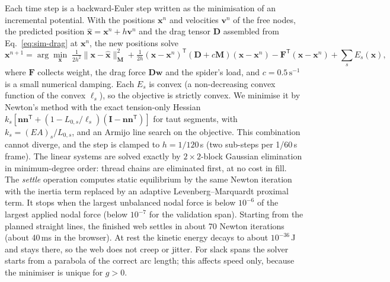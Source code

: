 Each time step is a backward-Euler step written as the minimisation of an incremental potential. With the positions
$\mathbf x^n$ and velocities $\mathbf v^n$ of the free nodes, the predicted position $\hat{\mathbf x} = \mathbf x^n + h\mathbf v^n$
and the drag tensor $\mathbf D$ assembled from Eq.~\eqref{eq:sim-drag} at $\mathbf x^n$, the new positions solve
\begin{equation}
  \mathbf x^{n+1} = \arg\min_{\mathbf x}\;
  \tfrac{1}{2h^2}\lVert\mathbf x-\hat{\mathbf x}\rVert^2_{\mathbf M}
  + \tfrac{1}{2h}(\mathbf x-\mathbf x^n)^{\mathsf T}(\mathbf D + c\mathbf M)(\mathbf x-\mathbf x^n)
  - \mathbf F^{\mathsf T}(\mathbf x-\mathbf x^n) + \sum_s E_s(\mathbf x),
  \label{eq:sim-ip}
\end{equation}
where $\mathbf F$ collects weight, the drag force $\mathbf D\mathbf w$ and the spider's load, and $c=0.5\,\text{s}^{-1}$
is a small numerical damping. Each $E_s$ is convex (a non-decreasing convex function of the convex $\ell_s$), so the
objective is strictly convex. We minimise it by Newton's method with the exact tension-only Hessian
$k_s[\mathbf n\mathbf n^{\mathsf T} + (1-L_{0,s}/\ell_s)(\mathbf I-\mathbf n\mathbf n^{\mathsf T})]$ for taut segments,
with $k_s=(EA)_s/L_{0,s}$, and an Armijo line search on the objective. This combination cannot diverge, and the step
is clamped to $h=1/120$\,s (two sub-steps per 1/60\,s frame). The linear systems are solved exactly by $2\times2$-block
Gaussian elimination in minimum-degree order: thread chains are eliminated first, at no cost in fill. The
\emph{settle} operation computes static equilibrium by the same Newton iteration with the inertia term replaced by an
adaptive Levenberg--Marquardt proximal term. It stops when the largest unbalanced nodal force is below $10^{-6}$ of the
largest applied nodal force (below $10^{-7}$ for the validation span). Starting from the planned straight lines, the
finished web settles in about 70 Newton iterations (about 40\,ms in the browser). At rest the kinetic energy decays to
about $10^{-36}$\,J and stays there, so the web does not creep or jitter. For slack spans the solver starts from a
parabola of the correct arc length; this affects speed only, because the minimiser is unique for $g>0$.

